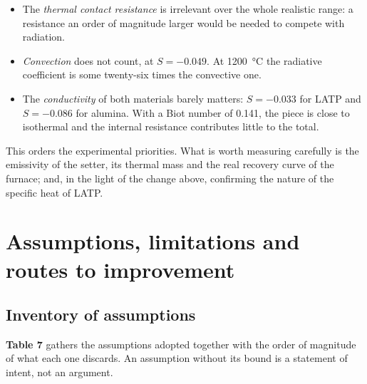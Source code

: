 \documentclass[11pt,a4paper]{article}
\newcommand{\tab}[1]{\textbf{\textcolor{uji}{Table #1}}}
\begin{document}
\begin{itemize}
\item The \emph{thermal contact resistance} is irrelevant over the whole
realistic range: a resistance an order of magnitude larger would be needed
to compete with radiation.

\item \emph{Convection} does not count, at $S = \num{-0.049}$. At
\SI{1200}{\celsius} the radiative coefficient is some twenty-six times the
convective one.

\item The \emph{conductivity} of both materials barely matters:
$S = \num{-0.033}$ for LATP and $S = \num{-0.086}$ for alumina. With a Biot
number of \num{0.141}, the piece is close to isothermal and the internal
resistance contributes little to the total.
\end{itemize}

This orders the experimental priorities. What is worth measuring carefully
is the emissivity of the setter, its thermal mass and the real recovery
curve of the furnace; and, in the light of the change above, confirming the
nature of the specific heat of LATP.

\section{Assumptions, limitations and routes to improvement}
\label{sec:limitaciones}

\subsection{Inventory of assumptions}

\tab{7} gathers the assumptions adopted together with the order of
magnitude of what each one discards. An assumption without its bound is a
statement of intent, not an argument.
\end{document}
